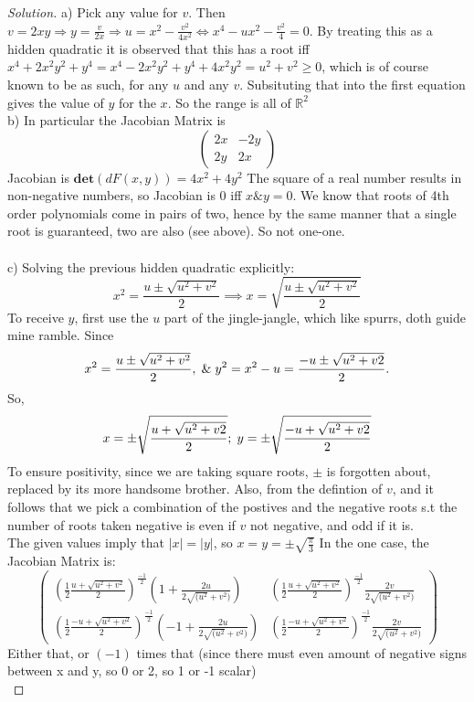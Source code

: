 \documentclass{article}
\newcommand{\R}{\mathbb{R}}
\newcommand{\ma}[1]{\mathbf{#1}}
\newenvironment{problem}[2][Problem]{\begin{trivlist}
\item[\hskip \labelsep {\bfseries #1}\hskip \labelsep {\bfseries #2.}]}{\end{trivlist}}
\newenvironment{solution}{\begin{proof}[Solution]}{\end{proof}}
\begin{document}
\begin{problem}{9.18}
\end{problem}
\begin{solution}
    a) Pick any value for $v$. Then $v =2xy \Rightarrow y = \frac{v}{2x} \Rightarrow u = x^2 -\frac{v^2}{4x^2} \iff x^4 -ux^{2} - \frac{v^2}{4} = 0$. By treating this as a hidden quadratic it is observed that this has a root iff $x^4 +2x^{2}y^{2} +y^{4} = x^{4} - 2x^{2}y^{2} + y^{4} +4x^{2}y^{2} = u^2 + v^2 \geq 0$, which is of course known to be as such, for any $u$ and any $v$. Subsituting that into the first equation gives the value of $y$ for the $x$. So the range is all of $\R^2$
  \\
    b) In particular the Jacobian Matrix is 
    \[
    \begin{pmatrix}
        2x & -2y \\
        2y & 2x
    \end{pmatrix}
    \]
    Jacobian is $\ma{det}(dF(x, y)) = 4x^2 +4y^2$  The square of a real number results in non-negative numbers, so Jacobian is 0 iff $x \& y = 0$. We know that roots of 4th order polynomials come in pairs of two, hence by the same manner that a single root is guaranteed, two are also (see above). So not one-one.
    \\ \\
    c) Solving the previous hidden quadratic explicitly: 
    \[
    x^{2} = {\frac{u\pm\sqrt{u^{2}+v^{2}}}{2}} \implies x = \sqrt{\frac{u\pm\sqrt{u^{2}+v^{2}}}{2}}
    \]
    To receive $y$, first use the $u$ part of the jingle-jangle, which like spurrs, doth guide mine ramble. Since
    \[
    x^{2} = \frac{u \pm \sqrt{u^{2}+v^{2}}}{2}, \hspace{1mm} \& \hspace{1mm} y^{2} = x^{2} - u = \frac{-u \pm \sqrt{u^{2}+v{2}}}{2}.
     \]
    So, 
    \[
    x = \pm \sqrt{\frac{u + \sqrt{u^{2}+v{2}}}{2}}; \hspace{1mm} y = \pm \sqrt{\frac{-u + \sqrt{u^{2}+v{2}}}{2}}
    \]
    To ensure positivity, since we are taking square roots, $\pm$ is forgotten about, replaced by its more handsome brother. Also, from the defintion of $v$, and it follows that we pick a combination of the postives and the negative roots s.t the number of roots taken negative is even if $v$ not negative, and odd if it is.
    \\
    The given values imply that $|x| = |y|$, so $x = y = \pm \sqrt{\frac{\pi}{3}}$
    In the one case, the Jacobian Matrix is:
    \[
    \begin{pmatrix}
        \left( \frac{1}{2}\frac{u +\sqrt{u^{2} + v^{2}}}{2}\right)^{\frac{-1}{2}}\left(1+\frac{2u}{2\sqrt{(u^{2}}+v^{2})}\right)  & \left( \frac{1}{2}\frac{u +\sqrt{u^{2} + v^{2}}}{2}\right)^{\frac{-1}{2}}\frac{2v}{2\sqrt{(u^{2}}+v^{2})}\\
        \left( \frac{1}{2}\frac{-u +\sqrt{u^{2} + v^{2}}}{2}\right)^{\frac{-1}{2}}\left(-1+\frac{2u}{2\sqrt{(u^{2}}+v^{2})}\right)   &\left( \frac{1}{2}\frac{-u +\sqrt{u^{2} + v^{2}}}{2}\right)^{\frac{-1}{2}}\frac{2v}{2\sqrt{(u^{2}}+v^{2})}
    \end{pmatrix}
    \]
    Either that, or $(-1)$ times that (since there must even amount of negative signs between x and y, so 0 or 2, so 1 or -1 scalar)
    \\


\end{solution}
\end{document}
